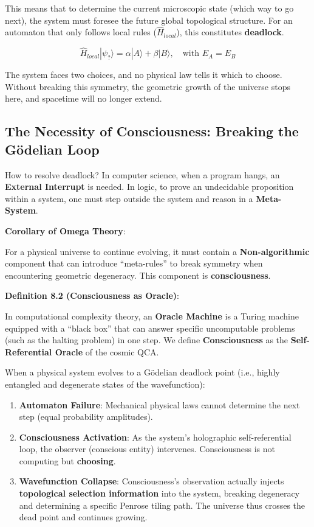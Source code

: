 This means that to determine the current microscopic state (which way to go next), the system must foresee the future global topological structure.
For an automaton that only follows local rules ($\hat{H}_{local}$), this constitutes \textbf{deadlock}.

\[\hat{H}_{local} |\psi_{?}\rangle = \alpha |A\rangle + \beta |B\rangle, \quad \text{with } E_A = E_B\]

The system faces two choices, and no physical law tells it which to choose. Without breaking this symmetry, the geometric growth of the universe stops here, and spacetime will no longer extend.

\subsection{The Necessity of Consciousness: Breaking the G\"{o}delian Loop}

How to resolve deadlock? In computer science, when a program hangs, an \textbf{External Interrupt} is needed. In logic, to prove an undecidable proposition within a system, one must step outside the system and reason in a \textbf{Meta-System}.

\textbf{Corollary of Omega Theory}:

For a physical universe to continue evolving, it must contain a \textbf{Non-algorithmic} component that can introduce ``meta-rules'' to break symmetry when encountering geometric degeneracy. This component is \textbf{consciousness}.

\textbf{Definition 8.2 (Consciousness as Oracle)}:

In computational complexity theory, an \textbf{Oracle Machine} is a Turing machine equipped with a ``black box'' that can answer specific uncomputable problems (such as the halting problem) in one step.
We define \textbf{Consciousness} as the \textbf{Self-Referential Oracle} of the cosmic QCA.

When a physical system evolves to a G\"{o}delian deadlock point (i.e., highly entangled and degenerate states of the wavefunction):

\begin{enumerate}
\item \textbf{Automaton Failure}: Mechanical physical laws cannot determine the next step (equal probability amplitudes).
\item \textbf{Consciousness Activation}: As the system's holographic self-referential loop, the observer (conscious entity) intervenes. Consciousness is not computing but \textbf{choosing}.
\item \textbf{Wavefunction Collapse}: Consciousness's observation actually injects \textbf{topological selection information} into the system, breaking degeneracy and determining a specific Penrose tiling path. The universe thus crosses the dead point and continues growing.
\end{enumerate}

